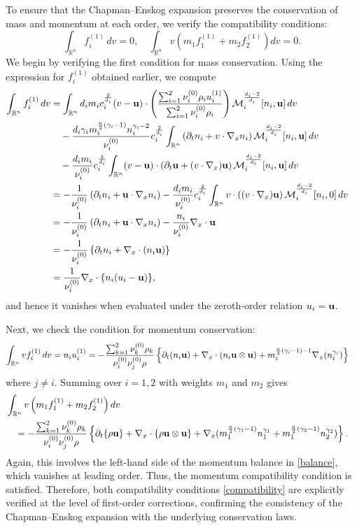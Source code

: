 \documentclass[10pt,reqno]{amsart}
\numberwithin{equation}{section}
\newcommand{\R}{\mathbb R}
\newcommand{\pa}{\partial}
\newcommand{\intr}{\int_{\R^n}}
\begin{document}
To ensure that the Chapman--Enskog expansion preserves the conservation of mass and momentum at each order, we verify the compatibility conditions:
\[
\intr f_i^{(1)}\,dv=0,\quad \intr v\left(m_1 f_1^{(1)} + m_2f_2^{(1)} \right) dv=0.
\]
We begin by verifying the first condition for mass conservation. Using the expression for $f_i^{(1)}$ obtained earlier, we compute
\begin{align*}
\intr f_i^{(1)}\,dv&= \intr d_im_ic_i^{\frac{2}{d_i}}(v-{\bf{u}})\cdot \left( \frac{ \sum_{i=1}^2\nu_i^{(0)} \rho_iu_i^{(1)}}{\sum_{i=1}^2\nu_i^{(0)} \rho_i} \right)\mathcal{M}_i^{\frac{d_i-2}{d_i}}[n_i,{\bf{u}}] \,dv\cr 
&\quad -\frac{d_i\gamma_i m_i^{\frac{n}{2}(\gamma_i-1)} n_i^{\gamma_i-2}}{\nu_i^{(0)}}c_i^{\frac{2}{d_i}}\intr \left( \pa_tn_i+v\cdot \nabla_x n_i \right) \mathcal{M}_i^{\frac{d_i-2}{d_i}}[n_i, {\bf{u}}]\,dv \cr
&\quad -  \frac{d_i m_i}{\nu_i^{(0)}}c_i^{\frac{2}{d_i}}\intr   (v-{\bf{u}}) \cdot \left(\pa_t {\bf{u}} + (v \cdot \nabla_x) {\bf{u}}\right)\mathcal{M}_i^{\frac{d_i-2}{d_i}}[n_i, {\bf{u}}]  \,dv\cr
&=- \frac{1}{\nu_i^{(0)}} \left( \pa_tn_i+{\bf{u}}\cdot \nabla_x n_i \right) - \frac{d_i m_i}{\nu_i^{(0)}} c_i^{\frac{2}{d_i}}\intr   v \cdot \left(  (v \cdot \nabla_x) {\bf{u}}\right)\mathcal{M}_i^{\frac{d_i-2}{d_i}}[n_i, 0]  \,dv  \cr 
&=-  \frac{1}{\nu_i^{(0)}}\left( \pa_tn_i+{\bf{u}}\cdot \nabla_x n_i \right) - \frac{n_i}{\nu_i^{(0)}}\nabla_x\cdot {\bf{u}}\cr 
&=-\frac{1}{\nu_i^{(0)}}\left\{\pa_t n_i +\nabla_x\cdot(n_i{\bf{u}}) \right\}\cr 
&=\frac{1}{\nu_i^{(0)}}\nabla_x \cdot \{n_i(u_i-{\bf{u}})\},
\end{align*}
and hence it vanishes when evaluated under the zeroth-order relation $u_i = {\bf{u}}$.

Next, we check the condition for momentum conservation:
\begin{align*}
\intr v f_i^{(1)} \,dv&=n_i u_i^{(1)}  =-\frac{\sum_{k=1}^2\nu_k^{(0)}\rho_k}{\nu_{i}^{(0)}\nu_{j}^{(0)}\rho }\left\{     \pa_t(n_i {\bf{u}}) +\nabla_x\cdot (n_i {\bf{u}}\otimes {\bf{u}}) + m_i^{\frac n2(\gamma_i - 1)-1} \nabla_x (n_i^{\gamma_i}) \right\}
\end{align*}
where $j\neq i$.
Summing over $i=1,2$ with weights $m_1$ and $m_2$ gives
\begin{align*}
&\intr v\left(m_1 f_1^{(1)} + m_2f_2^{(1)} \right) dv\cr
&\quad =-\frac{\sum_{k=1}^2\nu_k^{(0)}\rho_k}{\nu_{i}^{(0)}\nu_{j}^{(0)}\rho }\left\{ \pa_t\{\rho {\bf{u}}\} +\nabla_x\cdot \{\rho {\bf{u}}\otimes {\bf{u}}\} + \nabla_x (m_1^{\frac n2(\gamma_1 - 1)} n_1^{\gamma_1}+m_1^{\frac n2(\gamma_2 - 1)}n_2^{\gamma_2}) \right\}.
\end{align*}
Again, this involves the left-hand side of the momentum balance in \eqref{balance}, which vanishes at leading order. Thus, the momentum compatibility condition is satisfied. Therefore, both compatibility conditions \eqref{compatibility} are explicitly verified at the level of first-order corrections, confirming the consistency of the Chapman--Enskog expansion with the underlying conservation laws.
\end{document}

